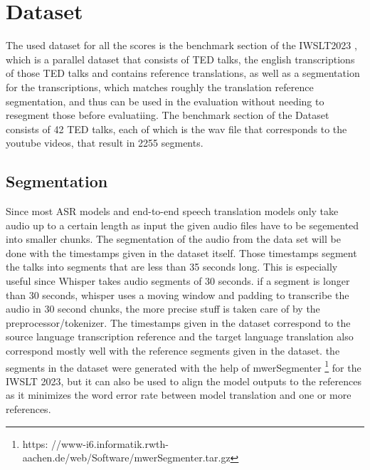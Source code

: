 \section{Dataset}
\label{ch:Dataset}
The used dataset for all the scores is the benchmark section of the IWSLT2023 \cite{sperber2024evaluating}, which is a parallel dataset that consists of TED talks, the english transcriptions of those TED talks and contains reference translations, as well as a segmentation for the transcriptions, which matches roughly the translation reference segmentation, and thus can be used in the evaluation without needing to resegment those before evaluatiing.
The benchmark section of the Dataset consists of 42 TED talks, each of which is the wav file that corresponds to the youtube videos, that result in 2255 segments. 
\subsection{Segmentation}
\label{sec:FirstContent:Segmentation}
Since most ASR models and end-to-end speech translation models only take audio up to a certain length as input the given audio files have to be segemented into smaller chunks. 
The segmentation of the audio from the data set will be done with the timestamps given in the dataset itself. 
Those timestamps segment the talks into segments that are less than 35 seconds long.
This is especially useful since Whisper takes audio segments of 30 seconds. 
if a segment is longer than 30 seconds, whisper uses a moving window and padding to transcribe the audio in 30 second chunks, the more precise stuff is taken care of by the preprocessor/tokenizer.
The timestamps given in the dataset correspond to the source language transcription reference and the target language translation also correspond mostly well with the reference segments given in the dataset. 
the segments in the dataset were generated with the help of mwerSegmenter \footnote{https:
//www-i6.informatik.rwth-aachen.de/web/Software/mwerSegmenter.tar.gz} for the IWSLT 2023, but it can also be used to align the model outputs to the references as it minimizes the word error rate between model translation and one or more references.

